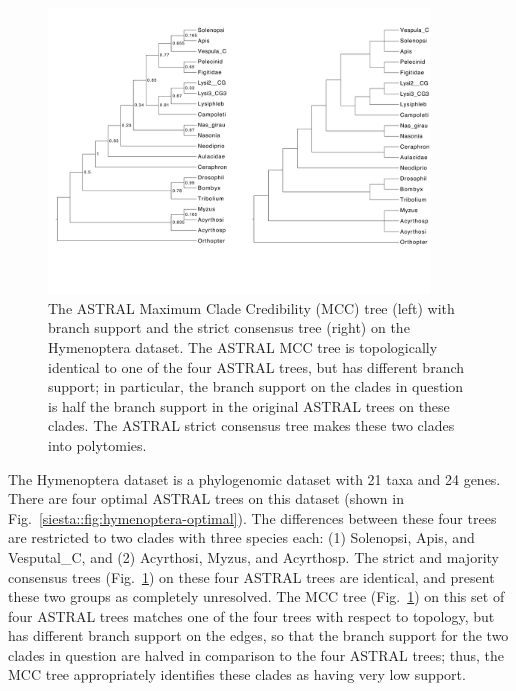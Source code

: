 \begin{figure}[!ht]
\centering
\includegraphics[width=0.9\textwidth]{siesta-figs/hymenoptera-figure8.pdf}
\caption[ASTRAL Maximum Clade Credibility Tree and strict consensus tree on biological Hymenoptera dataset]{The ASTRAL  Maximum Clade Credibility (MCC) tree (left) with branch support and the strict consensus tree (right) on the Hymenoptera dataset. 
The ASTRAL MCC tree is topologically identical to one of the four ASTRAL trees, but has different branch support; in particular, the branch support on the clades in question is half the branch support in the original ASTRAL trees on these clades. 
The ASTRAL strict consensus tree makes these two clades into polytomies. 
}\label{siesta::fig:hymenoptera-fig8}
\end{figure}


The Hymenoptera dataset is a phylogenomic dataset with 21 taxa and 24 genes.
There are four optimal ASTRAL trees on this dataset (shown in Fig.~\ref{siesta::fig:hymenoptera-optimal}). 
The differences between these four trees are restricted to two clades with three species each: (1) Solenopsi, Apis, and Vesputal\_C, and (2) Acyrthosi, Myzus, and Acyrthosp. 
The strict and majority consensus trees (Fig.~\ref{siesta::fig:hymenoptera-fig8}) on these four ASTRAL trees are identical, and present these two groups as completely unresolved.
The MCC tree (Fig.~\ref{siesta::fig:hymenoptera-fig8}) on this set of four ASTRAL trees matches one of the four trees with respect to topology, but has different branch support on the edges, so that the branch support for the two clades in question are halved in comparison to the four ASTRAL trees; thus, the MCC tree appropriately identifies these clades as having very low support.


